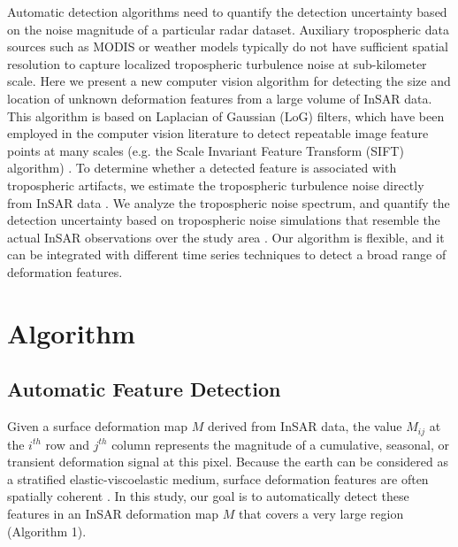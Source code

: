 Automatic detection algorithms need to quantify the detection uncertainty based on the noise magnitude of a particular radar dataset. Auxiliary tropospheric data sources such as MODIS or weather models typically do not have sufficient spatial resolution to capture localized tropospheric turbulence noise at sub-kilometer scale. Here we present a new computer vision algorithm for detecting the size and location of unknown deformation features from a large volume of InSAR data. This algorithm is based on Laplacian of Gaussian (LoG) filters, which have been employed in the computer vision literature to detect repeatable image feature points at many scales (e.g. the Scale Invariant Feature Transform (SIFT) algorithm) \cite{Witkin1987ScaleSpaceFiltering, Lindeberg1998FeatureDetectionAutomatic, Lowe2004DistinctiveImageFeatures}. To determine whether a detected feature is associated with tropospheric artifacts, we estimate the tropospheric turbulence noise directly from InSAR data \cite{Tymofyeyeva2015MitigationAtmosphericPhase}. We analyze the tropospheric noise spectrum, and quantify the detection uncertainty based on tropospheric noise simulations that resemble the actual InSAR observations over the study area \cite{Hanssen2001RadarInterferometryData}.
Our algorithm is flexible, and it can be integrated with different time series techniques to detect a broad range of deformation features.




\section{Algorithm}
\label{sec:methods}

\subsection{Automatic Feature Detection}
\label{subsec:methods-1-log}

Given a surface deformation map $M$ derived from InSAR data, the value $ M_{ij} $ at the $i^{th}$ row and $j^{th}$ column represents the magnitude of a cumulative, seasonal, or transient deformation signal at this pixel. Because the earth can be considered as a stratified elastic-viscoelastic medium, surface deformation features are often spatially coherent \cite{Segall2010EarthquakeVolcanoDeformation}. In this study, our goal is to automatically detect these features in an InSAR deformation map $M$ that covers a very large region (Algorithm 1).

